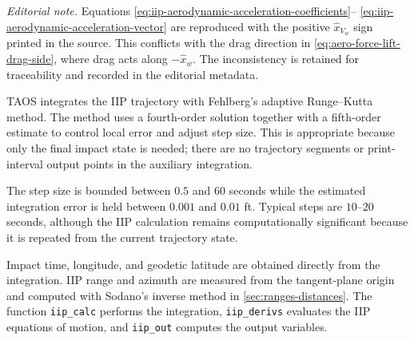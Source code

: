 \noindent\textit{Editorial note.} Equations
\ref{eq:iip-aerodynamic-acceleration-coefficients}--
\ref{eq:iip-aerodynamic-acceleration-vector} are reproduced with the positive
$\hat x_{V_w}$ sign printed in the source. This conflicts with the drag direction in
\cref{eq:aero-force-lift-drag-side}, where drag acts along
$-\hat x_w$. The inconsistency is retained for traceability and recorded in the
editorial metadata.

TAOS integrates the IIP trajectory with Fehlberg's adaptive Runge--Kutta method.
The method uses a fourth-order solution together with a fifth-order estimate to
control local error and adjust step size. This is appropriate because only the final
impact state is needed; there are no trajectory segments or print-interval output
points in the auxiliary integration.

The step size is bounded between $0.5$ and $60$ seconds while the estimated
integration error is held between $0.001$ and $0.01$ ft. Typical steps are
$10$--$20$ seconds, although the IIP calculation remains computationally
significant because it is repeated from the current trajectory state.

Impact time, longitude, and geodetic latitude are obtained directly from the
integration. IIP range and azimuth are measured from the tangent-plane origin and
computed with Sodano's inverse method in \cref{sec:ranges-distances}. The
function \texttt{iip\_calc} performs the integration, \texttt{iip\_derivs} evaluates
the IIP equations of motion, and \texttt{iip\_out} computes the output variables.
